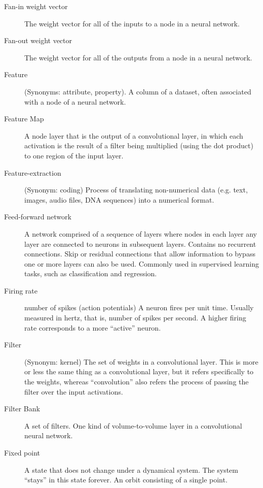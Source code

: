 \begin{description}
\item[Fan-in weight vector] The weight vector for all of the inputs to a node in a neural network.

\item[Fan-out weight vector] The weight vector for all of the outputs from a node in a neural network.

\item[Feature] (Synonyms: attribute, property). A column of a dataset, often associated with a node of a neural network.

\item[Feature Map] A node layer that is the output of a convolutional layer, in which each activation is the result of a filter being multiplied (using the dot product) to one region of the input layer.

\item[Feature-extraction] (Synonym: coding)  Process of translating non-numerical data (e.g. text, images, audio files, DNA sequences) into a numerical format. %

\item[Feed-forward network] A network comprised of a sequence of layers where nodes in each layer any layer are connected to neurons in subsequent layers. Contains no recurrent connections. Skip or residual connections that allow information to bypass one or more layers can also be used. Commonly used in supervised learning tasks, such as classification and regression.

\item[Firing rate] number of spikes (action potentials) A neuron fires per unit time. Usually measured in hertz, that is, number of spikes per second. A higher firing rate corresponds to a more ``active'' neuron. 

\item[Filter] (Synonym: kernel) The set of weights in a convolutional layer. This is more or less the same thing as a convolutional layer, but it refers specifically to the weights, whereas ``convolution'' also refers the process of passing the filter over the input activations.

\item[Filter Bank] A set of filters. One kind of volume-to-volume layer in a convolutional neural network. 

\item[Fixed point] A state that does not change under a dynamical system. The system ``stays'' in this state forever. An orbit consisting of a single point.


\end{description}
